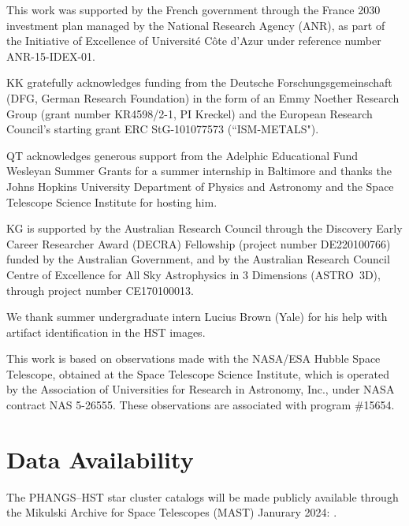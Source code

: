 \documentclass[linenumbers]{aastex63}
\begin{document}
This work was supported by the French government through the France 2030 investment plan managed by the National Research Agency (ANR), as part of the Initiative of Excellence of Université Côte d’Azur under reference number ANR-15-IDEX-01.

KK gratefully acknowledges funding from the Deutsche Forschungsgemeinschaft (DFG, German Research Foundation) in the form of an Emmy Noether Research Group (grant number KR4598/2-1, PI Kreckel) and the European Research Council’s starting grant ERC StG-101077573 (“ISM-METALS"). 

QT acknowledges generous support from the Adelphic Educational Fund Wesleyan Summer Grants for a summer internship in Baltimore and thanks the Johns Hopkins University Department of Physics and Astronomy and the Space Telescope Science Institute for hosting him.

KG is supported by the Australian Research Council through the Discovery Early Career Researcher Award (DECRA) Fellowship (project number DE220100766) funded by the Australian Government, and by the Australian Research Council Centre of Excellence for All Sky Astrophysics in 3 Dimensions (ASTRO~3D), through project number CE170100013.

We thank summer undergraduate intern Lucius Brown (Yale) for his help with artifact identification in the HST images.

This work is based on observations made with the NASA/ESA Hubble Space Telescope, obtained at the Space Telescope Science Institute, which is operated by the Association of Universities for Research in Astronomy, Inc., under NASA contract NAS 5-26555. These observations are associated with program \#15654. 


\section*{Data Availability}
The PHANGS--HST \citep{https://doi.org/10.17909/t9-r08f-dq31} star cluster catalogs will be made publicly available through the Mikulski Archive for Space Telescopes (MAST) Janurary 2024: 
.


   
 

\clearpage
\end{document}
